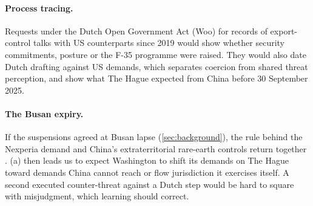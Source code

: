 \paragraph{Process tracing.} Requests under the Dutch Open Government Act (Woo) for records of export-control talks with US counterparts since 2019 would show whether security commitments, posture or the F-35 programme were raised. They would also date Dutch drafting against US demands, which separates coercion from shared threat perception, and show what The Hague expected from China before 30 September 2025.

\paragraph{The Busan expiry.} If the suspensions agreed at Busan lapse (\cref{sec:background}), the rule behind the Nexperia demand and China's extraterritorial rare-earth controls return together \citep{bis2025affiliates, mofcom2025pause}. (a) then leads us to expect Washington to shift its demands on The Hague toward demands China cannot reach or flow jurisdiction it exercises itself. A second executed counter-threat against a Dutch step would be hard to square with misjudgment, which learning should correct.
